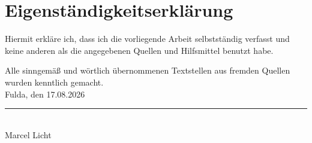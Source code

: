 \documentclass[a4paper, 12pt, openany]{article}
\begin{document}
\section*{Eigenständigkeitserklärung}
Hiermit erkläre ich, dass ich die vorliegende Arbeit selbstständig verfasst und keine anderen als die angegebenen Quellen und Hilfsmittel benutzt habe. 

Alle sinngemäß und wörtlich übernommenen Textstellen aus fremden Quellen wurden kenntlich gemacht.\\[2cm]
Fulda, den 17.08.2026 \\[1.5cm]
\rule{6cm}{0.4pt}\\
Marcel Licht
\clearpage


\renewcommand{\appendixtocname}{Anhänge}
\renewcommand{\appendixpagename}{Anhang}
\appendix
\addappheadtotoc



\end{document}
